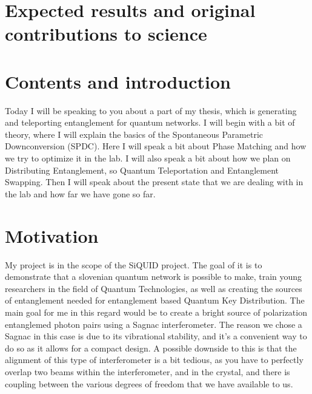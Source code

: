 \documentclass{article}
\theoremstyle{mytheoremstyle}
\theoremstyle{mytheoremstyle}
\theoremstyle{myproblemstyle}
\begin{document}
\section{Expected results and original contributions to science}

\section{Contents and introduction}
Today I will be speaking to you about a part of my thesis, which is generating and teleporting entanglement for quantum networks. I will begin with a bit of theory,
where I will explain the basics of the Spontaneous Parametric Downconversion (SPDC). Here I will speak a bit about Phase Matching and how we try to optimize it in the lab. I will also
speak a bit about how we plan on Distributing Entanglement, so Quantum Teleportation and Entanglement Swapping.
Then I will speak about the present state that we are dealing with in the lab and how far we have gone so far.

\section{Motivation}
My project is in the scope of the SiQUID project. The goal of it is to demonstrate that a slovenian quantum network is possible to make,
train young researchers in the field of Quantum Technologies, as well as creating the sources of entanglement needed for entanglement based Quantum Key Distribution.
The main goal for me in this regard would be to create a bright source of polarization entanglemed photon pairs using a Sagnac interferometer.
The reason we chose a Sagnac in this case is due to its vibrational stability, and it's a convenient way to do so as it allows for a compact design.
A possible downside to this is that the alignment of this type of interferometer is a bit tedious, as you have to perfectly overlap two beams within the interferometer,
and in the crystal, and there is coupling between the various degrees of freedom that we have available to us.
\end{document}
